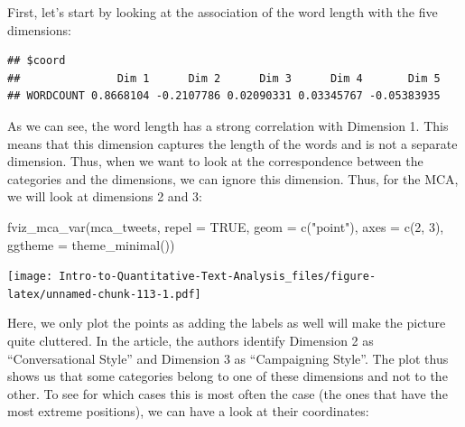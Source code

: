 \documentclass[
]{article}
\newenvironment{Shaded}{\begin{snugshade}}{\end{snugshade}}
\newcommand{\AttributeTok}[1]{\textcolor[rgb]{0.77,0.63,0.00}{#1}}
\newcommand{\ConstantTok}[1]{\textcolor[rgb]{0.00,0.00,0.00}{#1}}
\newcommand{\DecValTok}[1]{\textcolor[rgb]{0.00,0.00,0.81}{#1}}
\newcommand{\FunctionTok}[1]{\textcolor[rgb]{0.00,0.00,0.00}{#1}}
\newcommand{\NormalTok}[1]{#1}
\newcommand{\OtherTok}[1]{\textcolor[rgb]{0.56,0.35,0.01}{#1}}
\newcommand{\SpecialCharTok}[1]{\textcolor[rgb]{0.00,0.00,0.00}{#1}}
\newcommand{\StringTok}[1]{\textcolor[rgb]{0.31,0.60,0.02}{#1}}
\begin{document}
First, let's start by looking at the association of the word length with the five dimensions:

\begin{Shaded}
\end{Shaded}

\begin{verbatim}
## $coord
##               Dim 1      Dim 2      Dim 3      Dim 4       Dim 5
## WORDCOUNT 0.8668104 -0.2107786 0.02090331 0.03345767 -0.05383935
\end{verbatim}

As we can see, the word length has a strong correlation with Dimension 1. This means that this dimension captures the length of the words and is not a separate dimension. Thus, when we want to look at the correspondence between the categories and the dimensions, we can ignore this dimension. Thus, for the MCA, we will look at dimensions 2 and 3:

\begin{Shaded}
\begin{Highlighting}[]
\FunctionTok{fviz\_mca\_var}\NormalTok{(mca\_tweets,}
 \AttributeTok{repel =} \ConstantTok{TRUE}\NormalTok{,}
 \AttributeTok{geom =} \FunctionTok{c}\NormalTok{(}\StringTok{"point"}\NormalTok{),}
 \AttributeTok{axes =} \FunctionTok{c}\NormalTok{(}\DecValTok{2}\NormalTok{, }\DecValTok{3}\NormalTok{), }
 \AttributeTok{ggtheme =} \FunctionTok{theme\_minimal}\NormalTok{())}
\end{Highlighting}
\end{Shaded}

\texttt{[image: Intro-to-Quantitative-Text-Analysis\_files/figure-latex/unnamed-chunk-113-1.pdf]}

Here, we only plot the points as adding the labels as well will make the picture quite cluttered. In the article, the authors identify Dimension 2 as ``Conversational Style'' and Dimension 3 as ``Campaigning Style''. The plot thus shows us that some categories belong to one of these dimensions and not to the other. To see for which cases this is most often the case (the ones that have the most extreme positions), we can have a look at their coordinates:

\begin{Shaded}
\end{Shaded}
\end{document}
